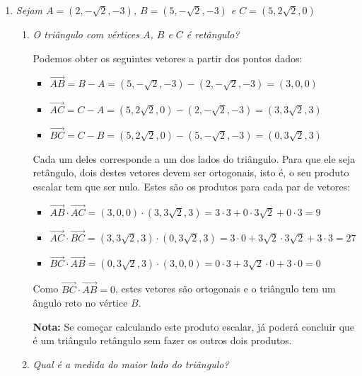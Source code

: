 \documentclass[12pt,a4paper]{article}
\newcommand{\vect}[1]{\overrightarrow{#1}}
\begin{document}
\begin{enumerate}
\item \textit{Sejam $A = (2, -\sqrt{2}, -3)$, $B = (5, -\sqrt{2}, -3)$ e $C = (5, 2\sqrt{2}, 0)$}
\begin{enumerate}
\item \textit{O triângulo com vértices $A$, $B$ e $C$ é retângulo?}

Podemos obter os seguintes vetores a partir dos pontos dados:
\begin{itemize}
\item $\vect{AB} = B - A
                 = (5, -\sqrt{2}, -3) - (2, -\sqrt{2}, -3)
                 = (3, 0, 0)$
\item $\vect{AC} = C - A
                 = (5, 2\sqrt{2}, 0) - (2, -\sqrt{2}, -3)
                 = (3, 3\sqrt{2}, 3)$
\item $\vect{BC} = C - B
                 = (5, 2\sqrt{2}, 0) - (5, -\sqrt{2}, -3)
                 = (0, 3\sqrt{2}, 3)$
\end{itemize}
Cada um deles corresponde a um dos lados do triângulo. Para que ele seja retângulo, dois destes vetores devem ser ortogonais, isto é, o seu produto escalar tem que ser nulo. Estes são os produtos para cada par de vetores:
\begin{itemize}
\item $\vect{AB} \cdot \vect{AC}
     = (3, 0, 0) \cdot (3, 3\sqrt{2}, 3)
     = 3\cdot 3 + 0 \cdot 3\sqrt{2} + 0 \cdot 3
     = 9$
\item $\vect{AC} \cdot \vect{BC}
     = (3, 3\sqrt{2}, 3) \cdot (0, 3\sqrt{2}, 3)
     = 3\cdot 0 + 3\sqrt{2} \cdot 3\sqrt{2} + 3 \cdot 3
     = 27$
\item $\vect{BC} \cdot \vect{AB}
     = (0, 3\sqrt{2}, 3) \cdot (3, 0, 0)
     = 0\cdot 3 + 3\sqrt{2} \cdot 0 + 3 \cdot 0
     = 0$
\end{itemize}
Como $\vect{BC} \cdot \vect{AB} = 0$, estes vetores são ortogonais e o triângulo tem um ângulo reto no vértice $B$.

\textbf{Nota:} Se começar calculando este produto escalar, já poderá concluir que é um triângulo retângulo sem fazer os outros dois produtos.
\item \textit{Qual é a medida do maior lado do triângulo?}


\end{enumerate}
\end{enumerate}
\end{document}
